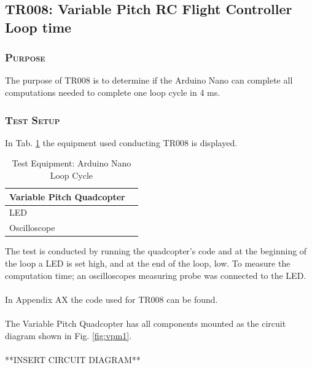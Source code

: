 \subsection{TR008: Variable Pitch RC Flight Controller Loop time}
         {}

\subsubsection*{\textsc{\medium Purpose}}
The purpose of TR008 is to determine if the Arduino Nano can complete all computations needed to complete one loop cycle in 4 ms.

\subsubsection*{\textsc{\medium Test Setup}}
In Tab. \ref{tab:tabt10} the equipment used conducting TR008 is displayed. 
\begin {table}[H]
    \begin{center}
    \caption {Test Equipment: Arduino Nano Loop Cycle} 
    \label{tab:tabt10} 
    \begin{tabular}{|l|l|}\hline 
        Variable Pitch Quadcopter     \\ \hline
        LED  \\ \hline
        Oscilloscope  \\ \hline
        \end{tabular}
    \end{center}
\end{table}

The test is conducted by running the quadcopter's code and at the beginning of the loop a LED is set high, and at the end of the loop, low. To measure the computation  time; an oscilloscopes measuring probe was connected to the LED.\\
\\
In Appendix AX the code used for TR008 can be found. \\
\\
The Variable Pitch Quadcopter has all components mounted as the circuit diagram shown in Fig. \ref{fig:vpm1}. \\
\\
**INSERT CIRCUIT DIAGRAM**

